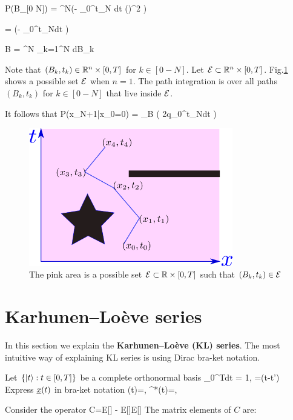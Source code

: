 \beq
P(B_{[0 \upto N]})
=
\gamma^N\exp\left(-\;
\int_0^{t_N} dt ()^2
\right)
\eeq

\beq
{}=
\exp\left(-\;
\int_0^{t_N}dt
\right)
\label{eq-px-div-pb}
\eeq

\beq
\cald B = \gamma^N \prod_{k=1}^N dB_k
\eeq

Note that
$(B_k, t_k)\in { \mathbb{R}}^n\times [0, T]$
for $k\in[0-N]$.
Let
${\cal E}\subset { \mathbb{R}}^n\times [0, T]$.
Fig.\ref{fig-possible-paths}
shows a possible set ${\cal E}$
when $n=1$.
The path integration is over all
paths $(B_k, t_k)$ for $k\in [0-N]$
that live inside ${\cal E}$.

It follows that
\beq
P(x_{N+1}|x_0=0)  =
\int_{\cale}\cald B\;
\exp\left(
{2q}\int_0^{t_N}dt
\right)
\eeq


\begin{figure}[h!]
\centering
\includegraphics[width=3.5in]
{stochastic-diff-eqns/possible-paths.png}
\caption{The pink area is a possible set
${\cal E}\subset{ \mathbb{R}}\times [0,T]$
such that  $(B_k, t_k)\in {\cal E}$
}
\label{fig-possible-paths}
\end{figure}

\section{Karhunen–Loève series}

In this section
we explain the {\bf Karhunen–Loève (KL) series}. The most intuitive
way of explaining  KL series is
using Dirac bra-ket notation.

Let $\{|t\rangle
 : t\in [0,T]\}$ be a complete orthonormal basis
\beq
\int_0^{T}dt\; = 1,
\;
=\delta(t-t')
\eeq
Express $\rvx(t)$ in bra-ket notation
\beq
\rvx(t)=,
\quad
\rvx^*(t)=,
\eeq

Consider the operator
\beq
C=E[\ket{\rvx}\bra{\rvx}]
-
E[\ket{\rvx}]E[\bra{\rvx}]
\eeq
The matrix elements
of $C$ are:

